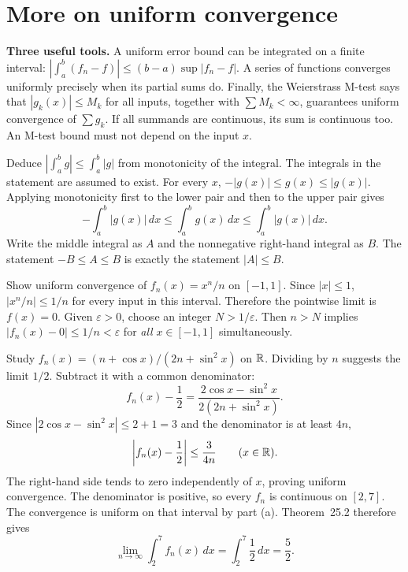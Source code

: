 \section{More on uniform convergence}
\label{sec:more-uniform-new}
\textbf{Three useful tools.} A uniform error bound can be integrated on a
finite interval: $|\int_a^b(f_n-f)|\le(b-a)\sup|f_n-f|$.
A series of functions converges uniformly precisely when its partial sums do.
Finally, the Weierstrass M-test says that $|g_k(x)|\le M_k$ for all inputs,
together with $\sum M_k<\infty$, guarantees uniform convergence of
$\sum g_k$. If all summands are continuous, its sum is continuous too.
An M-test bound must not depend on the input $x$.

\goal Deduce $|\int_a^b g|\le\int_a^b|g|$ from monotonicity of the integral.
The integrals in the statement are assumed to exist.
For every $x$, $-|g(x)|\le g(x)\le|g(x)|$.
Applying monotonicity first to the lower pair and then to the upper pair gives
\[
 -\int_a^b|g(x)|\,dx\le\int_a^b g(x)\,dx
 \le\int_a^b|g(x)|\,dx.
\]
Write the middle integral as $A$ and the nonnegative right-hand integral as
$B$. The statement $-B\le A\le B$ is exactly the statement $|A|\le B$.

\goal Show uniform convergence of $f_n(x)=x^n/n$ on $[-1,1]$.
Since $|x|\le1$, $|x^n/n|\le1/n$ for every input in this interval.
Therefore the pointwise limit is $f(x)=0$.
Given $\varepsilon>0$, choose an integer $N>1/\varepsilon$.
Then $n>N$ implies $|f_n(x)-0|\le1/n<\varepsilon$ for \emph{all}
$x\in[-1,1]$ simultaneously.

\goal Study $f_n(x)=(n+\cos x)/(2n+\sin^2x)$ on $\mathbb{R}$.
Dividing by $n$ suggests the limit $1/2$. Subtract it with a common denominator:
\[
 f_n(x)-\frac12
 =\frac{2\cos x-\sin^2x}{2(2n+\sin^2x)}.
\]
Since $|2\cos x-\sin^2x|\le2+1=3$ and the denominator is at least $4n$,
\[
 \left|f_n(x)-\frac12\right|\le\frac3{4n}
 \qquad(x\in\mathbb{R}).
\]
The right-hand side tends to zero independently of $x$, proving uniform convergence.
The denominator is positive, so every $f_n$ is continuous on $[2,7]$.
The convergence is uniform on that interval by part (a).
Theorem~25.2 therefore gives
\[
 \lim_{n\to\infty}\int_2^7 f_n(x)\,dx
 =\int_2^7\frac12\,dx=\frac52.
\]

